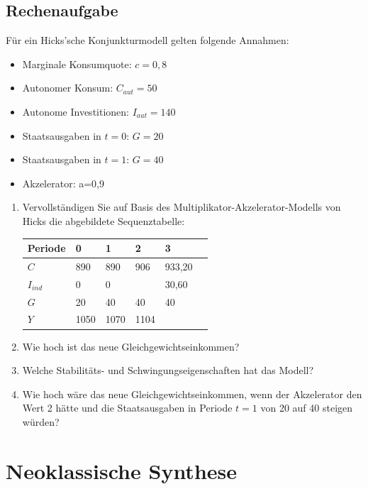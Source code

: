 \documentclass{scrartcl}
\begin{document}
\subsection{Rechenaufgabe}
Für ein Hicks'sche Konjunkturmodell gelten folgende Annahmen:
\begin{multicols}{2}
	\begin{itemize}
		\item Marginale Konsumquote: $c = 0,8$
		\item Autonomer Konsum: $C_{aut} = 50$
		\item Autonome Investitionen: $I_{aut} = 140$
		\item Staatsausgaben in $t=0$: $G = 20$
		\item Staatsausgaben in $t=1$: $G = 40$
		\item Akzelerator: a=0,9
	\end{itemize}
\end{multicols}
\begin{enumerate}
	\item Vervollständigen Sie auf Basis des Multiplikator-Akzelerator-Modells von Hicks die abgebildete Sequenztabelle:
	\begin{center}
		\begin{tabular}{|l|l|l|l|l|l|}
			\hline
			Periode      & 0    & 1    & 2    & 3 \\ \hline
			$C$          & 890  & 890  & 906  & 933,20          \\ \hline
			$I_{ind}$    & 0    & 0    &      & 30,60       \\ \hline
			$G$          & 20   & 40   & 40   & 40       \\ \hline
			$Y$          & 1050 & 1070 & 1104 &           \\ \hline
		\end{tabular}
	\end{center}
	\item Wie hoch ist das neue Gleichgewichtseinkommen?
	\item Welche Stabilitäts- und Schwingungseigenschaften hat das Modell?
	\item Wie hoch wäre das neue Gleichgewichtseinkommen, wenn der Akzelerator den Wert 2 hätte und die Staatsausgaben in Periode $t=1$ von 20 auf 40 steigen würden?
\end{enumerate}

\newpage
\section{Neoklassische Synthese}
\end{document}
